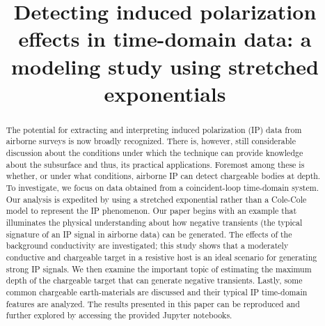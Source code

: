 \documentclass[manuscript]{geophysics}
\begin{document}
\title{Detecting induced polarization effects in time-domain data: a modeling study using stretched exponentials}

\renewcommand{\thefootnote}{\fnsymbol{footnote}}







\maketitle
\begin{abstract}
The potential for extracting and interpreting induced polarization (IP) data from airborne surveys is now broadly recognized. There is, however, still considerable discussion about the conditions under which the technique can provide knowledge about the subsurface and thus, its practical applications. Foremost among these is whether, or under what conditions, airborne IP can detect chargeable bodies at depth. To investigate, we focus on data obtained from a coincident-loop time-domain system. Our analysis is expedited by using a stretched exponential rather than a Cole-Cole model to represent the IP phenomenon. Our paper begins with an example that illuminates the physical understanding about how negative transients (the typical signature of an IP signal in airborne data) can be generated. The effects of the background conductivity are investigated; this study shows that a moderately conductive and chargeable target in a resistive host is an ideal scenario for generating strong IP signals. We then examine the important topic of estimating the maximum depth of the chargeable target that can generate negative transients. Lastly, some common chargeable earth-materials are discussed and their typical IP time-domain features are analyzed. The results presented in this paper can be reproduced and further explored by accessing the provided Jupyter notebooks.
\end{abstract}
\end{document}
